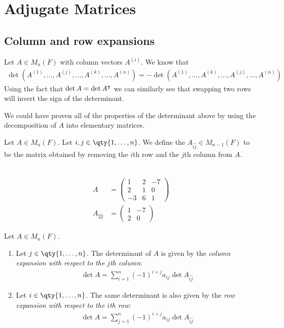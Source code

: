 \section{Adjugate Matrices}

\subsection{Column and row expansions}
Let $A \in M_n(F)$ with column vectors $A^{(i)}$.
We know that
\begin{align*}
	\det(A^{(1)}, \dots, A^{(j)}, \dots, A^{(k)}, \dots, A^{(n)}) = -\det(A^{(1)}, \dots, A^{(k)}, \dots, A^{(j)}, \dots, A^{(n)})
\end{align*}
Using the fact that $\det A = \det A^\intercal$ we can similarly see that swapping two rows will invert the sign of the determinant.
\begin{remark}
	We could have proven all of the properties of the determinant above by using the decomposition of $A$ into elementary matrices.
\end{remark}
\begin{definition}[Minor]
	Let $A \in M_n(F)$.
	Let $i, j \in \qty{1, \dots, n}$.
	We define the  $A_{\widehat{ij}} \in M_{n-1}(F)$ to be the matrix obtained by removing the $i$th row and the $j$th column from $A$.
\end{definition}

\begin{example} ~\vspace*{-1.5\baselineskip}
	\begin{align*}
		A &= \begin{pmatrix}1 & 2 & -7 \\2 & 1 & 0 \\-3 & 6 & 1\end{pmatrix} \\
		A_{\widehat{32}} &= \begin{pmatrix}1 & -7 \\2 & 0\end{pmatrix}
	\end{align*} 
\end{example} 

\begin{lemma}
	Let $A \in M_n(F)$.
	\begin{enumerate}
		\item Let $j \in \qty{1, \dots, n}$.
		      The determinant of $A$ is given by the \textit{column expansion with respect to the $j$th column}:
		      \begin{align*}
			      \det A = \sum_{i=1}^n (-1)^{i+j} a_{ij} \det A_{\widehat{ij}}
		      \end{align*}
		\item Let $i \in \qty{1, \dots, n}$.
		      The same determinant is also given by the \textit{row expansion with respect to the $i$th row}:
		      \begin{align*}
			      \det A = \sum_{j=1}^n (-1)^{i+j} a_{ij} \det A_{\widehat{ij}}
		      \end{align*}
	\end{enumerate}
\end{lemma}

